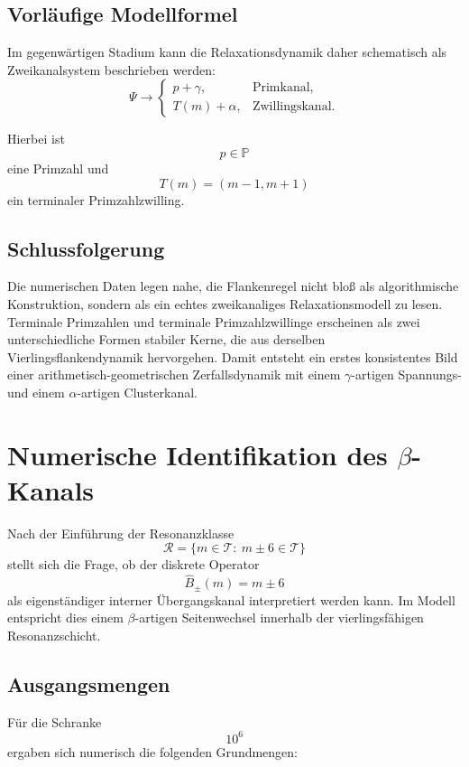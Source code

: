 \documentclass[11pt,a4paper]{article}
\theoremstyle{definition}
\theoremstyle{plain}
\theoremstyle{remark}
\begin{document}
	\subsection{Vorläufige Modellformel}
	
	Im gegenwärtigen Stadium kann die Relaxationsdynamik daher schematisch als Zweikanalsystem beschrieben werden:
	\[
	\Psi
	\longrightarrow
	\begin{cases}
		p + \gamma, & \text{Primkanal},\\[0.5em]
		T(m) + \alpha, & \text{Zwillingskanal}.
	\end{cases}
	\]
	
	Hierbei ist
	\[
	p \in \mathbb P
	\]
	eine Primzahl und
	\[
	T(m)=(m-1,m+1)
	\]
	ein terminaler Primzahlzwilling.
	
	\subsection{Schlussfolgerung}
	
	Die numerischen Daten legen nahe, die Flankenregel nicht bloß als algorithmische Konstruktion, sondern als ein echtes zweikanaliges Relaxationsmodell zu lesen. 
	Terminale Primzahlen und terminale Primzahlzwillinge erscheinen als zwei unterschiedliche Formen stabiler Kerne, die aus derselben Vierlingsflankendynamik hervorgehen. 
	Damit entsteht ein erstes konsistentes Bild einer arithmetisch-geometrischen Zerfallsdynamik mit einem \(\gamma\)-artigen Spannungs- und einem \(\alpha\)-artigen Clusterkanal.
	
	\section{Numerische Identifikation des \texorpdfstring{$\beta$}{beta}-Kanals}
	
	Nach der Einführung der Resonanzklasse
	\[
	\mathcal R
	=
	\{m\in\mathcal T:\ m\pm 6\in\mathcal T\}
	\]
	stellt sich die Frage, ob der diskrete Operator
	\[
	\hat B_\pm(m)=m\pm 6
	\]
	als eigenständiger interner Übergangskanal interpretiert werden kann. 
	Im Modell entspricht dies einem \(\beta\)-artigen Seitenwechsel innerhalb der vierlingsfähigen Resonanzschicht.
	
	\subsection{Ausgangsmengen}
	
	Für die Schranke
	\[
	10^6
	\]
	ergaben sich numerisch die folgenden Grundmengen:
	
\end{document}
